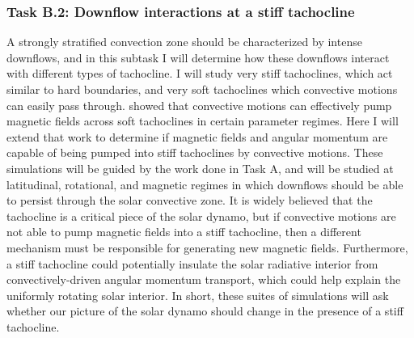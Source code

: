 \documentclass[aasms,11pt]{article}
\begin{document}
\subsubsection{Task B.2: Downflow interactions at a stiff tachocline}
\label{sct:taskB2}
A strongly stratified convection zone should be characterized by intense downflows, and in this subtask I will determine how these downflows interact with different types of tachocline.
I will study very stiff tachoclines, which act similar to hard boundaries, and very soft tachoclines which convective motions can easily pass through.
\citet{tobias&all1998} showed that convective motions can effectively pump magnetic fields across soft tachoclines in certain parameter regimes.
Here I will extend that work  to determine if magnetic fields and angular momentum are capable of being pumped into stiff tachoclines by convective motions.
These simulations will be guided by the work done in Task A, and will be studied at latitudinal, rotational, and magnetic regimes in which downflows should be able to persist through the solar convective zone.
It is widely believed that the tachocline is a critical piece of the solar dynamo, but if convective motions are not able to pump magnetic fields into a stiff tachocline, then a different mechanism must be responsible for generating new magnetic fields.
Furthermore, a stiff tachocline could potentially insulate the solar radiative interior from convectively-driven angular momentum transport, which could help explain the uniformly rotating solar interior.
In short, these suites of simulations will ask whether our picture of the solar dynamo should change in the presence of a stiff tachocline.
\end{document}
